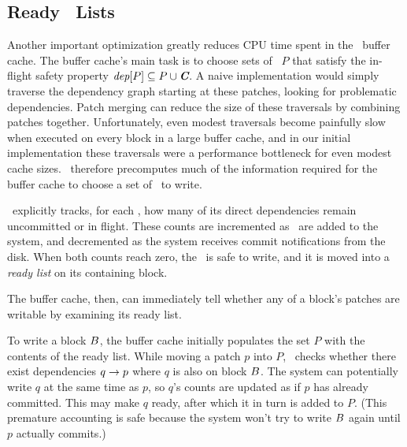 
\subsection{Ready \Patch\ Lists}
\label{sec:patch:readylist}
\label{readylist}

\newcommand{\PReady}[1]{\ensuremath{#1.\textit{ready}}}

Another important optimization greatly reduces CPU time spent in the
\Kudos\ buffer cache.
%
The buffer cache's main task is to choose sets of \patches\ $P$ that
satisfy the in-flight safety property $\PDepset{P} \subseteq P \cup
\PDisk$.
%
A naive implementation would simply traverse the dependency graph starting
at these patches, looking for problematic dependencies.
%
Patch merging can reduce the size of these traversals by combining patches
together.
%
Unfortunately, even modest traversals become painfully slow when executed
on every block in a large buffer cache, and in our initial implementation
these traversals were a performance bottleneck for even modest cache
sizes.
% 
\Featherstitch\ therefore precomputes much of the information
required for the buffer cache to choose a set of \patches\ to write.

\Kudos\ explicitly tracks, for each \patch, how many of its
direct dependencies remain uncommitted or in flight.
%
These counts are incremented as \patches\ are added to the system, and
decremented as the system receives commit notifications from the disk.
%
When both counts reach zero, the \patch\ is safe to write, and it is moved
into a \emph{ready list} on its containing block.
%
\begin{comment}
(\Noop\ \patches\ automatically commit when all their dependencies commit.)
\end{comment}
%
The buffer cache, then, can immediately tell whether any of a block's
patches are writable by examining its ready list.

To write a block $B$, the buffer cache initially populates the set $P$ with the
contents of the ready list.
%
While moving a patch $p$ into $P$, \Kudos\ checks whether there exist
dependencies $q \rightarrow p$ where $q$ is also on block $B$.
%
The system can potentially write $q$ at the same time as $p$, so $q$'s
counts are updated as if $p$ has already committed.
%
This may make $q$ ready, after which it in turn is added to $P$.
%
(This premature accounting is safe because the system won't try to write
$B$ again until $p$ actually commits.)


